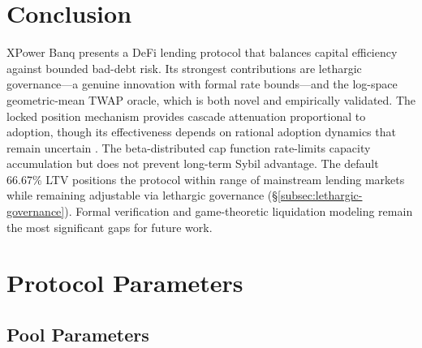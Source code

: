 \documentclass[10pt,a4paper,twocolumn]{article}
\begin{document}
\section{Conclusion}
\label{sec:conclusion}

XPower Banq presents a DeFi lending protocol that balances capital efficiency against bounded bad-debt risk. Its strongest contributions are lethargic governance---a genuine innovation with formal rate bounds---and the log-space geometric-mean TWAP oracle, which is both novel and empirically validated. The locked position mechanism provides cascade attenuation proportional to adoption, though its effectiveness depends on rational adoption dynamics that remain uncertain \cite{mtp}. The beta-distributed cap function rate-limits capacity accumulation but does not prevent long-term Sybil advantage. The default 66.67\% LTV positions the protocol within range of mainstream lending markets while remaining adjustable via lethargic governance (\S\ref{subsec:lethargic-governance}). Formal verification and game-theoretic liquidation modeling remain the most significant gaps for future work.

\ifbundle\else
\appendix
\fi

\section{Protocol Parameters}
\label{apx:parameters}

\subsection{Pool Parameters}
\end{document}
